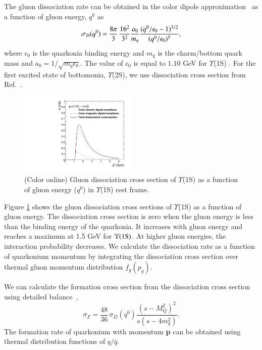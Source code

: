 {  The gluon dissociation rate can be obtained in the color dipole
approximation~\cite{Bhanot:1979vb} as a function of gluon energy, $q^0$ as
 \begin{equation}
    \sigma_{D}(q^{0}) = {8\pi \over 3} \, {16^2 \over 3^2} {a_0 \over m_q}  \frac{(q^0/\epsilon_0 - 1)^{3/2}} {(q^0/\epsilon_0)^5},
 \end{equation}
  where $\epsilon_0$ is the quarkonia binding energy and $m_q$ is the charm/bottom quark mass 
  and $a_0=1/\sqrt{m_q\epsilon_0}$.
  The value of $\epsilon_0$ is equal to $1.10$ GeV for $\Upsilon$(1S) \cite{Karsch:1987pv}. 
For the first excited state of bottomonia, $\Upsilon$(2S), we use dissociation
 cross section from Ref.~\cite{Arleo:2001mp}.

  \begin{figure}
    \begin{center}
    \includegraphics[width=0.50\textwidth]{Figures/Fig17_Y1S_SigmaDq0.pdf}
    \caption{(Color online) Gluon dissociation cross section of $\Upsilon$(1S) as a
      function of gluon energy ($q^{0}$) in $\Upsilon$(1S) rest frame.}
    \label{fig:SigmaDQ0}
    \end{center}
  \end{figure}

  
  Figure \ref{fig:SigmaDQ0} shows the gluon dissociation cross sections of
$\Upsilon$(1S) as a function of gluon energy. The dissociation cross section
is zero when the gluon energy is less than the binding energy of the quarkonia.
It increases with gluon energy and reaches a maximum at 1.5 GeV for 
$\Upsilon(1{\rm S})$. At higher gluon energies, the interaction
probability decreases. We calculate the dissociation rate as a function of quarkonium
momentum by integrating the dissociation cross section over thermal gluon momentum 
distribution $f_{g}(p_g)$.


 We can calculate the formation cross section from the dissociation cross section using
detailed balance~\cite{Thews:2000rj,Thews:2005vj},
  \begin{equation}
    \sigma_{F} = \frac{48}{36}\,\sigma_{D}(q^0)\frac{(s-M_{Q}^2)^{2}}{s(s-4m_q^{2})}.
  \end{equation}
  The formation rate of quarkonium with momentum {\bf p} can be obtained using
  thermal distribution functions of  $q/\bar{q}$.
  
}
